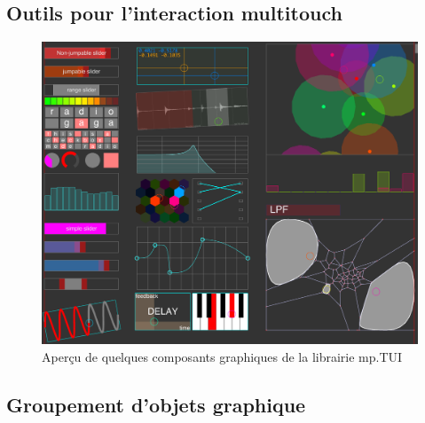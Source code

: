 \subsection{Outils pour l'interaction multitouch}

\begin{figure}[!htbp]
	\includegraphics[width=\textwidth]{gfx/mpTUI/mp-TUI-preview.png}
	\caption{Aperçu de quelques composants graphiques de la librairie mp.TUI}
	\label{fig:visual_representation:mp.TUI}
\end{figure}



\subsection{Groupement d'objets graphique}

